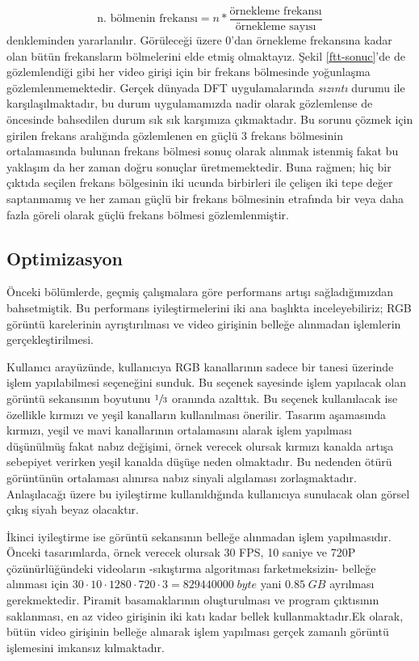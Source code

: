 \documentclass[a4paper, 12pt]{article}
\begin{document}
\begin{equation}
\label{eqn:fft}
\text{n. bölmenin frekansı} = n * \frac{\textrm{örnekleme frekansı}}{\text{örnekleme sayısı}}
\end{equation}
denkleminden yararlanılır. Görüleceği üzere 0'dan örnekleme frekansına kadar olan bütün frekansların bölmelerini elde etmiş olmaktayız. Şekil \ref{ftt-sonuc}'de de gözlemlendiği gibi her video girişi için bir frekans bölmesinde yoğunlaşma gözlemlenmemektedir. Gerçek dünyada DFT uygulamalarında \textit{sızıntı} durumu ile karşılaşılmaktadır, bu durum uygulamamızda nadir olarak gözlemlense de öncesinde bahsedilen durum sık sık karşımıza çıkmaktadır. Bu sorunu çözmek için girilen frekans aralığında gözlemlenen en güçlü 3 frekans bölmesinin ortalamasında bulunan frekans bölmesi sonuç olarak alınmak istenmiş fakat bu yaklaşım da her zaman doğru sonuçlar üretmemektedir. Buna rağmen; hiç bir çıktıda seçilen frekans bölgesinin iki ucunda birbirleri ile çelişen iki tepe değer saptanmamış ve her zaman güçlü bir frekans bölmesinin etrafında bir veya daha fazla göreli olarak güçlü frekans bölmesi gözlemlenmiştir.  



\subsection{Optimizasyon}

Önceki bölümlerde, geçmiş çalışmalara göre performans artışı sağladığımızdan bahsetmiştik. Bu performans iyileştirmelerini iki ana başlıkta inceleyebiliriz; RGB görüntü karelerinin ayrıştırılması ve video girişinin belleğe alınmadan işlemlerin gerçekleştirilmesi. 

Kullanıcı arayüzünde, kullanıcıya RGB kanallarının sadece bir tanesi üzerinde işlem yapılabilmesi seçeneğini sunduk. Bu seçenek sayesinde işlem yapılacak olan görüntü sekansının boyutunu $\sfrac{1}{3}$ oranında azalttık. Bu seçenek kullanılacak ise özellikle kırmızı ve yeşil kanalların kullanılması önerilir. Tasarım aşamasında kırmızı, yeşil ve mavi kanallarının ortalamasını alarak işlem yapılması düşünülmüş fakat nabız değişimi, örnek verecek olursak kırmızı kanalda artışa sebepiyet verirken yeşil kanalda düşüşe neden olmaktadır. Bu nedenden ötürü görüntünün ortalaması alınırsa nabız sinyali algılaması zorlaşmaktadır. Anlaşılacağı üzere bu iyileştirme kullanıldığında kullanıcıya sunulacak olan görsel çıkış siyah beyaz olacaktır.

İkinci iyileştirme ise görüntü sekansının belleğe alınmadan işlem yapılmasıdır. Önceki tasarımlarda, örnek verecek olursak 30 FPS, 10 saniye ve 720P çözünürlüğündeki videoların -sıkıştırma algoritması farketmeksizin- belleğe alınması için $30\cdot10\cdot1280\cdot720\cdot3=829440000\; byte$ yani $0.85\;GB$ ayrılması gerekmektedir. Piramit basamaklarının oluşturulması ve program çıktısının saklanması, en az video girişinin iki katı kadar bellek kullanmaktadır.Ek olarak, bütün video girişinin belleğe alınarak işlem yapılması gerçek zamanlı görüntü işlemesini imkansız kılmaktadır. 
\end{document}
